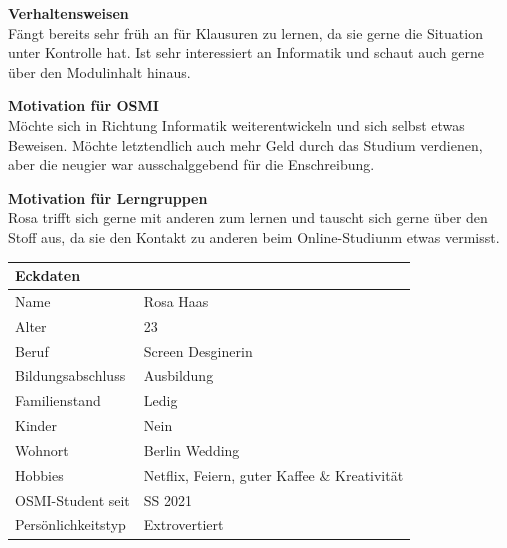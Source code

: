 \documentclass{article}
\begin{document}
\vspace{0em}

\begin{flushleft}
	\textbf{Verhaltensweisen} \\
	Fängt bereits sehr früh an für Klausuren zu lernen, da sie gerne die Situation unter Kontrolle hat.
	Ist sehr interessiert an Informatik und schaut auch gerne über den Modulinhalt hinaus.
	\vspace{1em}

	\textbf{Motivation für OSMI} \\
	Möchte sich in Richtung Informatik weiterentwickeln und sich selbst etwas Beweisen. Möchte letztendlich
	auch mehr Geld durch das Studium verdienen, aber die neugier war ausschalggebend für die Enschreibung. \\
	\vspace{1em}

	\textbf{Motivation für Lerngruppen} \\
	Rosa trifft sich gerne mit anderen zum lernen und tauscht sich gerne über den Stoff aus, da sie den
	Kontakt zu anderen beim Online-Studiunm etwas vermisst.
\end{flushleft}

\vspace{1em}

\begin{center}
	\begin{tabularx}{\textwidth}{|l|X|}
		\hline
		\textbf{Eckdaten}  &                                              \\
		\hline
		Name               & Rosa Haas                                    \\
		\hline
		Alter              & 23                                           \\
		\hline
		Beruf              & Screen Desginerin                            \\
		\hline
		Bildungsabschluss  & Ausbildung                                   \\
		\hline
		Familienstand      & Ledig                                        \\
		\hline
		Kinder             & Nein                                         \\
		\hline
		Wohnort            & Berlin Wedding                               \\
		\hline
		Hobbies            & Netflix, Feiern, guter Kaffee \& Kreativität \\
		\hline
		OSMI-Student seit  & SS 2021                                      \\
		\hline
		Persönlichkeitstyp & Extrovertiert                                \\
		\hline
	\end{tabularx}
\end{center}
\end{document}
